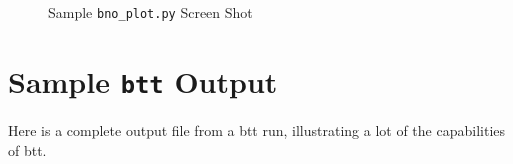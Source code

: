 \documentclass{article}
\begin{document}
\begin{figure}[b]
\leavevmode\centering
{}
\caption{\label{fig:bno_plot}Sample \texttt{bno\_plot.py} Screen Shot}
\end{figure}

\clearpage
\newpage\section{\label{sec:appendix}Sample \texttt{btt}
Output}
  Here is a complete output file from a btt run, illustrating a lot of the
  capabilities of btt.

\end{document}
